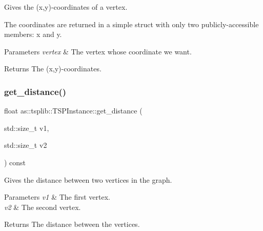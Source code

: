 Gives the (x,y)-\/coordinates of a vertex. 

The coordinates are returned in a simple struct with only two publicly-\/accessible members\+: x and y.


\begin{DoxyParams}{Parameters}
{\em vertex} & The vertex whose coordinate we want. \\
\hline
\end{DoxyParams}
\begin{DoxyReturn}{Returns}
The (x,y)-\/coordinates. 
\end{DoxyReturn}
\mbox{\label{classas_1_1tsplib_1_1TSPInstance_a52535b9ad72eaaac80f2a7a1518e680f}} 
\subsubsection{\texorpdfstring{get\+\_\+distance()}{get\_distance()}}
{\footnotesize\ttfamily float as\+::tsplib\+::\+T\+S\+P\+Instance\+::get\+\_\+distance (\begin{DoxyParamCaption}\item[{std\+::size\+\_\+t}]{v1,  }\item[{std\+::size\+\_\+t}]{v2 }\end{DoxyParamCaption}) const\hspace{0.3cm}{\ttfamily [inline]}}



Gives the distance between two vertices in the graph. 


\begin{DoxyParams}{Parameters}
{\em v1} & The first vertex. \\
\hline
{\em v2} & The second vertex. \\
\hline
\end{DoxyParams}
\begin{DoxyReturn}{Returns}
The distance between the vertices. 
\end{DoxyReturn}
\mbox{\label{classas_1_1tsplib_1_1TSPInstance_a3beae0a769669c417e8bc7d1e41a7550}} 
